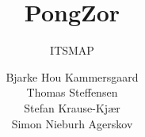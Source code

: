 \documentclass[10pt,a4paper]{scrartcl}
\title{PongZor}
\subtitle{ITSMAP}
\author{Bjarke Hou Kammersgaard\\Thomas Steffensen\\Stefan Krause-Kjær\\Simon Nieburh Agerskov}
\begin{document}
\maketitle
\pagebreak

\tableofcontents
\pagebreak






\end{document}
